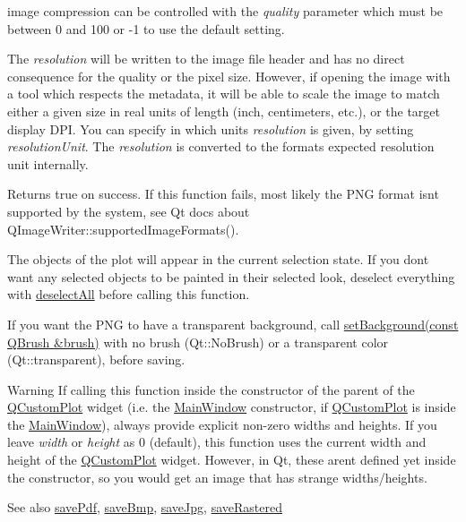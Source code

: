 image compression can be controlled with the {\itshape quality} parameter which must be between 0 and 100 or -\/1 to use the default setting.

The {\itshape resolution} will be written to the image file header and has no direct consequence for the quality or the pixel size. However, if opening the image with a tool which respects the metadata, it will be able to scale the image to match either a given size in real units of length (inch, centimeters, etc.), or the target display D\+PI. You can specify in which units {\itshape resolution} is given, by setting {\itshape resolution\+Unit}. The {\itshape resolution} is converted to the format\textquotesingle{}s expected resolution unit internally.

Returns true on success. If this function fails, most likely the P\+NG format isn\textquotesingle{}t supported by the system, see Qt docs about Q\+Image\+Writer\+::supported\+Image\+Formats().

The objects of the plot will appear in the current selection state. If you don\textquotesingle{}t want any selected objects to be painted in their selected look, deselect everything with \hyperlink{class_q_custom_plot_a9d4808ab925b003054085246c92a257c}{deselect\+All} before calling this function.

If you want the P\+NG to have a transparent background, call \hyperlink{class_q_custom_plot_a8ed256cf467bfa7ba1f9feaae62c3bd0}{set\+Background(const Q\+Brush \&brush)} with no brush (Qt\+::\+No\+Brush) or a transparent color (Qt\+::transparent), before saving.

\begin{DoxyWarning}{Warning}
If calling this function inside the constructor of the parent of the \hyperlink{class_q_custom_plot}{Q\+Custom\+Plot} widget (i.\+e. the \hyperlink{class_main_window}{Main\+Window} constructor, if \hyperlink{class_q_custom_plot}{Q\+Custom\+Plot} is inside the \hyperlink{class_main_window}{Main\+Window}), always provide explicit non-\/zero widths and heights. If you leave {\itshape width} or {\itshape height} as 0 (default), this function uses the current width and height of the \hyperlink{class_q_custom_plot}{Q\+Custom\+Plot} widget. However, in Qt, these aren\textquotesingle{}t defined yet inside the constructor, so you would get an image that has strange widths/heights.
\end{DoxyWarning}
\begin{DoxySeeAlso}{See also}
\hyperlink{class_q_custom_plot_ad5acd34f6b39c3516887d7e54fec2412}{save\+Pdf}, \hyperlink{class_q_custom_plot_ae3a86ed0795670e50afa21759d4fa13d}{save\+Bmp}, \hyperlink{class_q_custom_plot_a76f0d278e630a711fa6f48048cfd83e4}{save\+Jpg}, \hyperlink{class_q_custom_plot_ad7723ce2edfa270632ef42b03a444352}{save\+Rastered} 
\end{DoxySeeAlso}
\mbox{\label{class_q_custom_plot_ad7723ce2edfa270632ef42b03a444352}} 
